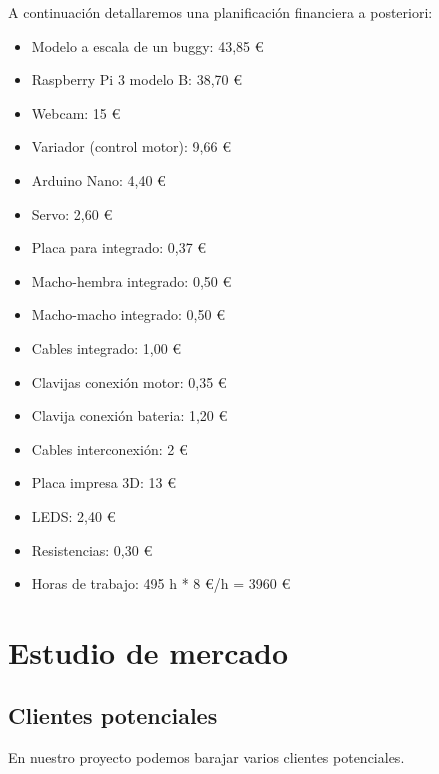 \documentclass{pclass}
\begin{document}
A continuación detallaremos una planificación financiera a posteriori:
\begin{itemize}
	\item Modelo a escala de un buggy: 43,85 \euro
	\item Raspberry Pi 3 modelo B: 38,70 \euro
	\item Webcam: 15 \euro
	\item Variador (control motor): 9,66 \euro
	\item Arduino Nano: 4,40 \euro
	\item Servo: 2,60 \euro
	\item Placa para integrado: 0,37 \euro
	\item Macho-hembra integrado: 0,50 \euro
	\item Macho-macho integrado: 0,50 \euro
	\item Cables integrado: 1,00 \euro
	\item Clavijas conexión motor: 0,35 \euro
	\item Clavija conexión bateria: 1,20 \euro
	\item Cables interconexión: 2 \euro
	\item Placa impresa 3D: 13 \euro
	\item LEDS: 2,40 \euro
	\item Resistencias: 0,30 \euro
	\item Horas de trabajo: 495 h * 8 \euro/h = 3960 \euro

\end{itemize}

\section{Estudio de mercado}
\subsection{Clientes potenciales}

	En nuestro proyecto podemos barajar varios clientes potenciales.
	
\end{document}
